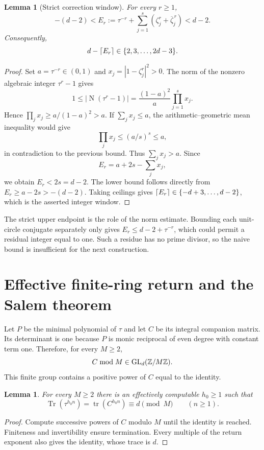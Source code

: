 \documentclass[11pt,a4paper]{article}
\newtheorem{lemma}[theorem]{Lemma}
\theoremstyle{definition}\newtheorem{definition}[theorem]{Definition}
\theoremstyle{remark}\newtheorem{remark}[theorem]{Remark}
\DeclareMathOperator{\Tr}{Tr}\DeclareMathOperator{\Norm}{N}\DeclareMathOperator{\trdeg}{trdeg}\DeclareMathOperator{\ord}{ord}\DeclareMathOperator{\lcm}{lcm}
\begin{document}
\begin{lemma}[Strict correction window]\label{lem:salemgap}
For every $r\ge1$,
\[
 -(d-2)< E_r:=\tau^{-r}+\sum_{j=1}^s(\zeta_j^r+\overline\zeta_j^{\,r})<d-2.
\]
Consequently,
\[
 d-\left\lceil E_r\right\rceil\in\{2,3,\ldots,2d-3\}.
\]
\end{lemma}
\begin{proof}
Set $a=\tau^{-r}\in(0,1)$ and $x_j=|1-\zeta_j^r|^2>0$. The norm of the nonzero algebraic integer $\tau^r-1$ gives
\[
 1\le|\Norm(\tau^r-1)|
 =\frac{(1-a)^2}{a}\prod_{j=1}^s x_j.
\]
Hence $\prod_jx_j\ge a/(1-a)^2>a$. If $\sum_jx_j\le a$, the arithmetic--geometric mean inequality would give
\[
 \prod_jx_j\le(a/s)^s\le a,
\]
in contradiction to the previous bound. Thus $\sum_jx_j>a$. Since
\[
 E_r=a+2s-\sum_jx_j,
\]
we obtain $E_r<2s=d-2$. The lower bound follows directly from
$E_r\ge a-2s>-(d-2)$. Taking ceilings gives
$\left\lceil E_r\right\rceil\in\{-d+3,\ldots,d-2\}$, which is the asserted integer window.
\end{proof}

The strict upper endpoint is the role of the norm estimate. Bounding each unit-circle conjugate separately only gives $E_r\le d-2+\tau^{-r}$, which could permit a residual integer equal to one. Such a residue has no prime divisor, so the naive bound is insufficient for the next construction.

\section{Effective finite-ring return and the Salem theorem}
Let $P$ be the minimal polynomial of $\tau$ and let $C$ be its integral companion matrix. Its determinant is one because $P$ is monic reciprocal of even degree with constant term one. Therefore, for every $M\ge2$,
\[
 C\bmod M\in\operatorname{GL}_d(\mathbb Z/M\mathbb Z).
\]
This finite group contains a positive power of $C$ equal to the identity.

\begin{lemma}\label{lem:matrix}
For every $M\ge2$ there is an effectively computable $h_0\ge1$ such that
\[
 \Tr(\tau^{h_0n})=\operatorname{tr}(C^{h_0n})\equiv d\pmod M
 \qquad(n\ge1).
\]
\end{lemma}
\begin{proof}
Compute successive powers of $C$ modulo $M$ until the identity is reached. Finiteness and invertibility ensure termination. Every multiple of the return exponent also gives the identity, whose trace is $d$.
\end{proof}
\end{document}
